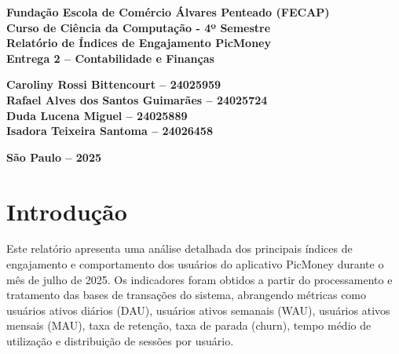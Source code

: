 \documentclass[12pt]{article}
\begin{document}

\begin{center}
\textbf{Fundação Escola de Comércio Álvares Penteado (FECAP)}\\
\textbf{Curso de Ciência da Computação - 4º Semestre}\\[2cm]

\vspace*{\fill}
\textbf{\Large Relatório de Índices de Engajamento PicMoney}\\[0.5cm]
\textbf{Entrega 2 – Contabilidade e Finanças}\\[2cm]
\end{center}

\noindent\hspace*{6cm}\textbf{Caroliny Rossi Bittencourt – 24025959}\\
\hspace*{6cm}\textbf{Rafael Alves dos Santos Guimarães – 24025724}\\
\hspace*{6cm}\textbf{Duda Lucena Miguel – 24025889}\\
\hspace*{6cm}\textbf{Isadora Teixeira Santoma – 24026458}\\[2cm]

\vspace*{\fill}
\begin{center}
\vfill
\textbf{São Paulo – 2025}
\end{center}
\newpage
\onehalfspacing

\section*{Introdução}

Este relatório apresenta uma análise detalhada dos principais índices de engajamento e comportamento dos usuários do aplicativo PicMoney durante o mês de julho de 2025.
Os indicadores foram obtidos a partir do processamento e tratamento das bases de transações do sistema, abrangendo métricas como usuários ativos diários (DAU), usuários ativos semanais (WAU), usuários ativos mensais (MAU), taxa de retenção, taxa de parada (churn), tempo médio de utilização e distribuição de sessões por usuário.
\end{document}
